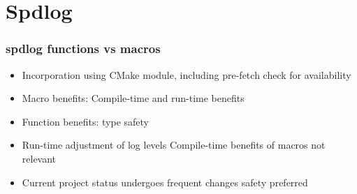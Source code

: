 \section{Spdlog}

\begin{frame}
    \frametitle{spdlog functions vs macros}

    \begin{itemize}
        \item Incorporation using CMake module, including pre-fetch check for availability
        \item Macro benefits: Compile-time and run-time benefits
        \item Function benefits: type safety
        \item Run-time adjustment of log levels \Rightarrow Compile-time benefits of macros not relevant
        \item Current project status undergoes frequent changes \Rightarrow safety preferred
    \end{itemize}

\end{frame}